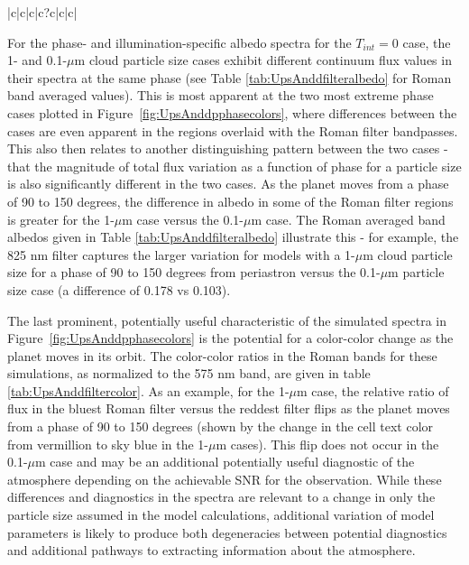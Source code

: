 \documentclass[12pt, letterpaper]{aastex631}
\begin{document}
\begin{table}[t]
\begin{tabular}{|c|c|c|c?c|c|c|}
\end{tabular}
{\caption{Color-color ratios of simulated averaged albedo values for Ups And d in the Roman filters as a function of orbital phase for the $T_{int}=0$ case with $0.1$ and $1$ $\mu$$m$ H$_{2}$O cloud particle sizes. Colors are normalized to the average albedo values for simulations of Ups And d in the 575 nm filter at a particular phase.  Ratios below one (bluer spectra) are colored in sky blue while ratios above one (redder spectra) are in vermillion.  Note that the trend in spectra as a function of phase stays relatively consistent (slightly blue) for the 0.1 $\mu$$m$ cases with increasing phase while the 1 $\mu$$m$ case \textit{flips from redder to bluer spectra} with increasing phase. }} \label{tab:UpsAnddfiltercolor}
\end{table}

For the phase- and illumination-specific albedo spectra for the $T_{int}=0$ case, the 1- and 0.1-$\mu$m cloud particle size cases exhibit different continuum flux values in their spectra at the same phase (see Table \ref{tab:UpsAnddfilteralbedo} for Roman band averaged values).  This is most apparent at the two most extreme phase cases plotted in Figure~\ref{fig:UpsAnddpphasecolors}, where differences between the cases are even apparent in the regions overlaid with the Roman filter bandpasses. This also then relates to another distinguishing pattern between the two cases - that the magnitude of total flux variation as a function of phase for a particle size is also significantly different in the two cases.  As the planet moves from a phase of 90 to 150 degrees, the difference in albedo in some of the Roman filter regions is greater for the 1-$\mu$m case versus the 0.1-$\mu$m case. The Roman averaged band albedos given in Table \ref{tab:UpsAnddfilteralbedo} illustrate this - for example, the 825 nm filter captures the larger variation for models with a 1-$\mu$m cloud particle size for a phase of 90 to 150 degrees from periastron versus the 0.1-$\mu$m particle size case (a difference of 0.178 vs 0.103).

The last prominent, potentially useful characteristic of the simulated spectra in Figure~\ref{fig:UpsAnddpphasecolors} is the potential for a color-color change as the planet moves in its orbit.  The color-color ratios in the Roman bands for these simulations, as normalized to the 575 nm band, are given in table \ref{tab:UpsAnddfiltercolor}.  As an example, for the 1-$\mu$m case, the relative ratio of flux in the bluest Roman filter versus the reddest filter flips as the planet moves from a phase of 90 to 150 degrees (shown by the change in the cell text color from vermillion to sky blue in the 1-$\mu$m cases).  This flip does not occur in the 0.1-$\mu$m case and may be an additional potentially useful diagnostic of the atmosphere depending on the achievable SNR for the observation. While these differences and diagnostics in the spectra are relevant to a change in only the particle size assumed in the model calculations, additional variation of model parameters is likely to produce both degeneracies between potential diagnostics and additional pathways to extracting information about the atmosphere. 
\end{document}
